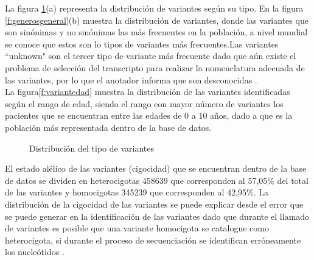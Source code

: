 La figura \ref{f:variantesgeneral}(a) representa la distribución de variantes según su tipo. En la figura \ref{f:generosgeneral}(b) muestra la distribución  de variantes, donde las variantes que son sinónimas y no sinónimas las más frecuentes en la población, a  nivel mundial se conoce que estos son lo tipos de variantes más frecuentes\cite{Fu2013}.Las variantes ``unknown"  son el tercer tipo de variante más frecuente dado que aún existe el problema de selección del transcripto para realizar la nomenclatura adecuada de las variantes, por lo que el anotador informa que son desconocidas \cite{McCarthy2014}.\\

 La figura\ref{f:variantedad} muestra la distribución de las variantes identificadas según el rango de edad, siendo el rango con mayor número de variantes los pacientes que se encuentran entre las edades de 0 a 10 años, dado a que es la población más representada dentro de la base de datos. \\

\begin{figure}[H]
	\centering
	\caption{Distribución del tipo de variantes}
	\label{f:variantesgeneral}
\end{figure}

El estado alélico de las variantes (cigocidad) que se encuentran dentro de la base de datos se dividen en heterocigotas 458639 que corresponden al 57,05\% del total de las variantes  y homocigotas 345239 que corresponden al 42,95\%. La distribución de la cigocidad de las variantes se puede explicar desde el error que se puede generar en la identificación de las variantes dado que durante el llamado  de variantes es posible que una variante homocigota se catalogue como heterocigota, si durante el proceso de secuenciación se identifican erróneamente los nucleótidos \cite{Babraham2016}\cite{Pirooznia2014}. 

